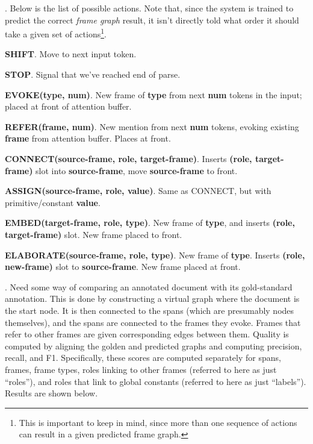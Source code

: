 \documentclass[11pt]{article}
\begin{document}
\myspace
\p {}. Below is the list of possible actions. Note that, since the system is trained to predict the correct \textit{frame graph} result, it isn't directly told what order it should take a given set of actions\footnote{This is important to keep in mind, since more than one sequence of actions can result in a given predicted frame graph.}.
\begin{compactitem}
	\item \textbf{SHIFT}. Move to next input token.
	\item \textbf{STOP}. Signal that we've reached end of parse.
	\item \textbf{EVOKE(type, num)}. New frame of \textbf{type} from next \textbf{num} tokens in the input; placed at front of attention buffer.
	\item \textbf{REFER(frame, num)}. New mention from next \textbf{num} tokens, evoking existing \textbf{frame} from attention buffer. Places at front.
	\item \textbf{CONNECT(source-frame, role, target-frame)}. Inserts \textbf{(role, target-frame)} slot into \textbf{source-frame}, move \textbf{source-frame} to front.
	\item \textbf{ASSIGN(source-frame, role, value)}. Same as CONNECT, but with primitive/constant \textbf{value}.
	\item \textbf{EMBED(target-frame, role, type)}. New frame of \textbf{type}, and inserts \textbf{(role, target-frame)} slot. New frame placed to front.
	\item \textbf{ELABORATE(source-frame, role, type)}. New frame of \textbf{type}. Inserts \textbf{(role, new-frame)} slot to \textbf{source-frame}. New frame placed at front.
\end{compactitem}

\myspace
\p {}. Need some way of comparing an annotated document with its gold-standard annotation. This is done by constructing a virtual graph where the document is the start node. It is then connected to the spans (which are presumably nodes themselves), and the spans are connected to the frames they evoke. Frames that refer to other frames are given corresponding edges between them. Quality is computed by aligning the golden and predicted graphs and computing precision, recall, and F1. Specifically, these scores are computed separately for spans, frames, frame types, roles linking to other frames (referred to here as just ``roles''), and roles that link to global constants (referred to here as just ``labels''). Results are shown below.
\end{document}
